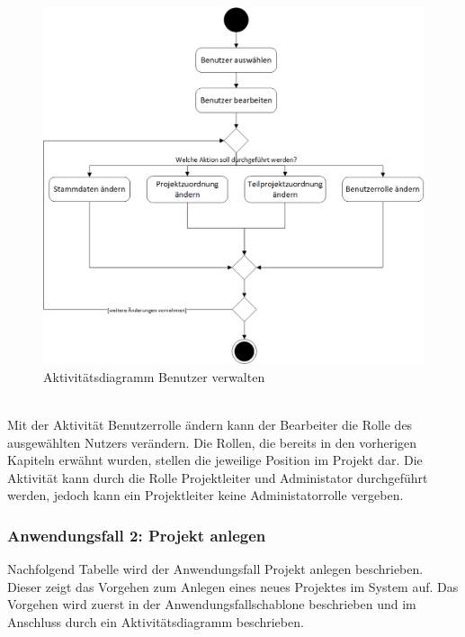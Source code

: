 \begin{figure}[h!]
    \centering
    \includegraphics[scale=0.67]{./Bilder/AD1_BenutzerVerwalten.png}
    \caption[Aktivitätsdiagramm Anwendungsfall 1]{Aktivitätsdiagramm Benutzer verwalten}
    \label{fig:AD1}
\end{figure}
\\Mit der Aktivität \glqq{}Benutzerrolle ändern\grqq{} kann der Bearbeiter die Rolle des ausgewählten Nutzers verändern. Die Rollen, die bereits in den vorherigen Kapiteln erwähnt wurden, stellen die jeweilige Position im Projekt dar. Die Aktivität kann durch die Rolle Projektleiter und Administator durchgeführt werden, jedoch kann ein Projektleiter keine Administatorrolle vergeben.

\newpage
\subsubsection{Anwendungsfall 2: Projekt anlegen}
Nachfolgend Tabelle wird der Anwendungsfall \glqq{}Projekt anlegen\grqq{} beschrieben. Dieser zeigt das Vorgehen zum Anlegen eines neues Projektes im System auf. Das Vorgehen wird zuerst in der Anwendungsfallschablone beschrieben und im Anschluss durch ein Aktivitätsdiagramm beschrieben.\\

